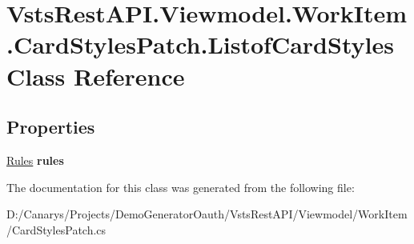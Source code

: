 \hypertarget{class_vsts_rest_a_p_i_1_1_viewmodel_1_1_work_item_1_1_card_styles_patch_1_1_listof_card_styles}{}\section{Vsts\+Rest\+A\+P\+I.\+Viewmodel.\+Work\+Item.\+Card\+Styles\+Patch.\+Listof\+Card\+Styles Class Reference}
\label{class_vsts_rest_a_p_i_1_1_viewmodel_1_1_work_item_1_1_card_styles_patch_1_1_listof_card_styles}
\subsection*{Properties}
\begin{DoxyCompactItemize}
\item 
\mbox{\label{class_vsts_rest_a_p_i_1_1_viewmodel_1_1_work_item_1_1_card_styles_patch_1_1_listof_card_styles_a4ec646e962581c487c4859fdee154e37}} 
\mbox{\hyperlink{class_vsts_rest_a_p_i_1_1_viewmodel_1_1_work_item_1_1_card_styles_patch_1_1_rules}{Rules}} {\bfseries rules}
\end{DoxyCompactItemize}


The documentation for this class was generated from the following file\+:\begin{DoxyCompactItemize}
\item 
D\+:/\+Canarys/\+Projects/\+Demo\+Generator\+Oauth/\+Vsts\+Rest\+A\+P\+I/\+Viewmodel/\+Work\+Item/Card\+Styles\+Patch.\+cs\end{DoxyCompactItemize}
